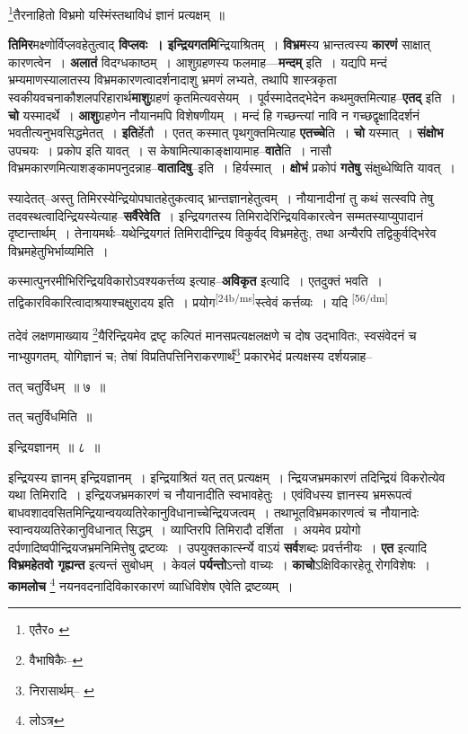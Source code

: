 \documentclass[article,12pt,a4paper]{memoir}
\begin{document}
	  \pstart \footnote{एतैर० \cite{dp-msB} \cite{dp-msD}}तैरनाहितो विभ्रमो यस्मिंस्तथाविधं ज्ञानं प्रत्यक्षम् ॥
	\pend
      

	  \pstart \textbf{तिमिर}मक्ष्णोर्विप्लवहेतुत्वाद् \textbf{विप्लवः । इन्द्रियगतमि}न्द्रियाश्रितम् । \textbf{विभ्रम}स्य भ्रान्तत्वस्य \textbf{कारणं} साक्षात् कारणत्वेन । \textbf{अलातं} विदग्धकाष्ठम् । आशुग्रहणस्य फलमाह—\textbf{मन्दम्} इति । यद्यपि मन्दं भ्रम्यमाणस्यालातस्य विभ्रमकारणत्वादर्शनादाशु भ्रमणं लभ्यते, तथापि शास्त्रकृता स्वकीयवचनाकौशलपरिहारार्थ\textbf{माशु}ग्रहणं कृतमित्यवसेयम् । पूर्वस्मादेतद्भेदेन कथमुक्तमित्याह--\textbf{एतद्} इति । \textbf{चो} यस्मादर्थे । \textbf{आशु}ग्रहणेन नौयानमपि विशेषणीयम् । मन्दं हि गच्छन्त्यां नावि न गच्छद्वृक्षादिदर्शनं भवतीत्यनुभवसिद्धमेतत् । \textbf{इति}र्हेतौ । एतत् कस्मात् पृथगुक्तमित्याह \textbf{एतच्चे}ति । \textbf{चो} यस्मात् । \textbf{संक्षोभ} उपचयः । प्रकोप इति यावत् । स केषामित्याकाङ्क्षायामाह--\textbf{वाते}ति । नासौ विभ्रमकारणमित्याशङ्कामपनुदन्नाह--\textbf{वातादिषु}--इति । हिर्यस्मात् । \textbf{क्षोभं} प्रकोपं \textbf{गतेषु} संक्षुब्धेष्विति यावत् ।
	\pend
      

	  \pstart स्यादेतत्--अस्तु तिमिरस्येन्द्रियोपघातहेतुकत्वाद् भ्रान्तज्ञानहेतुत्वम् । नौयानादीनां तु कथं सत्स्वपि तेषु तदवस्थत्वादिन्द्रियस्येत्याह--\textbf{सर्वैरेवेति} । इन्द्रियगतस्य तिमिरादेरिन्द्रियविकारत्वेन सम्मतस्याप्युपादानं दृष्टान्तार्थम् । तेनायमर्थः--यथेन्द्रियगतं तिमिरादीन्द्रिय विकुर्वद् विभ्रमहेतुः, तथा अन्यैरपि तद्विकुर्वद्भिरेव विभ्रमहेतुभिर्भाव्यमिति ।
	\pend
      

	  \pstart कस्मात्पुनरमीभिरिन्द्रियविकारोऽवश्यकर्त्तव्य इत्याह--\textbf{अविकृत} इत्यादि । एतदुक्तं भवति । तद्विकारविकारित्वादाश्रयाश्चक्षुरादय इति । प्रयोग\leavevmode\textsuperscript{\rmlatinfont\tiny [24b/ms]}स्त्वेवं कर्त्तव्यः । यदि  \leavevmode\textsuperscript{\rmlatinfont\tiny [56/dm]} 
	  
	तदेवं लक्षणमाख्याय \footnote{वैभाषिकैः--\cite{dp-msD-n}}यैरिन्द्रियमेव द्रष्टृ कल्पितं मानसप्रत्यक्षलक्षणे च दोष उद्भावितः, स्वसंवेदनं च नाभ्युपगतम्, योगिज्ञानं च; तेषां विप्रतिपत्तिनिराकरणार्थं\footnote{निरासार्थम्--\cite{dp-msB} \cite{dp-msC} \cite{dp-msD}} प्रकारभेदं प्रत्यक्षस्य दर्शयन्नाह-- 
	  
	तत् चतुर्विधम् ॥ ७ ॥ 
	  
	तत् चतुर्विधमिति ॥ 
	  
	इन्द्रियज्ञानम् ॥ ८ ॥ 
	  
	इन्द्रियस्य ज्ञानम् इन्द्रियज्ञानम् । इन्द्रियाश्रितं यत् तत् प्रत्यक्षम् । न्द्रियजभ्रमकारणं तदिन्द्रियं विकरोत्येव यथा तिमिरादि । इन्द्रियजभ्रमकारणं च नौयानादीति स्वभावहेतुः । एवंविधस्य ज्ञानस्य भ्रमरूपत्वं बाधवशादवसितमिन्द्रियान्वयव्यतिरेकानुविधानाच्चेन्द्रियजत्वम् । तथाभूतविभ्रमकारणत्वं च नौयानादेः स्वान्वयव्यतिरेकानुविधानात् सिद्धम् । व्याप्तिरपि तिमिरादौ दर्शिता । अयमेव प्रयोगो दर्पणादिष्वपीन्द्रियजभ्रमनिमित्तेषु द्रष्टव्यः । उपयुक्तकार्त्स्न्ये वाऽयं \textbf{सर्व}शब्दः प्रवर्त्तनीयः । \textbf{एत} इत्यादि \textbf{विभ्रमहेतवो गृह्यन्त} इत्यन्तं सुबोधम् । केवलं \textbf{पर्यन्तो}ऽन्तो वाच्यः । \textbf{काचो}ऽक्षिविकारहेतू रोगविशेषः । \textbf{कामलोच} \footnote{लोऽत्र} नयनवदनादिविकारकारणं व्याधिविशेष एवेति द्रष्टव्यम् ।
	\pend
      
\end{document}
